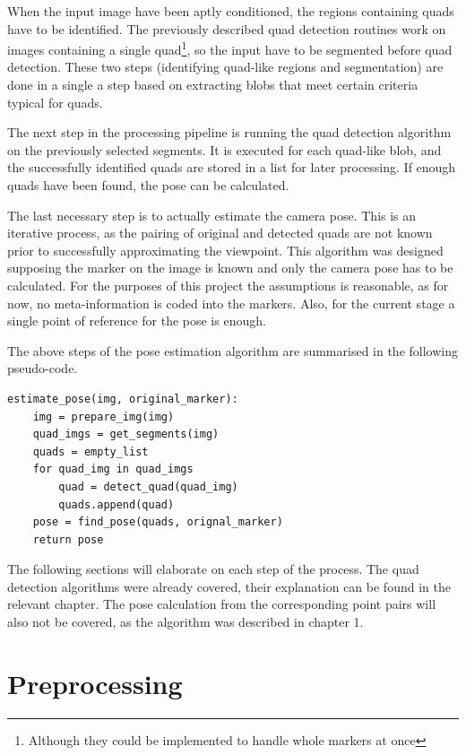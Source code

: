 When the input image have been aptly conditioned, the regions containing quads have to be identified.
The previously described quad detection routines work on images containing a single quad\footnote{Although they could be implemented to handle whole markers at once}, so the input have to be segmented before quad detection.
These two steps (identifying quad-like regions and segmentation) are done in a single a step based on extracting blobs that meet certain criteria typical for quads.

The next step in the processing pipeline is running the quad detection algorithm on the previously selected segments.
It is executed for each quad-like blob, and the successfully identified quads are stored in a list for later processing.
If enough quads have been found, the pose can be calculated.

The last necessary step is to actually estimate the camera pose.
This is an iterative process, as the pairing of original and detected quads are not known prior to successfully approximating the viewpoint.
This algorithm was designed supposing the marker on the image is known and only the camera pose has to be calculated.
For the purposes of this project the assumptions is reasonable, as for now, no meta-information is coded into the markers.
Also, for the current stage a single point of reference for the pose is enough.

The above steps of the pose estimation algorithm are summarised in the following pseudo-code.
\begin{lstlisting}
estimate_pose(img, original_marker):
    img = prepare_img(img)
    quad_imgs = get_segments(img)
    quads = empty_list
    for quad_img in quad_imgs
        quad = detect_quad(quad_img)
        quads.append(quad)
    pose = find_pose(quads, orignal_marker) 
    return pose
\end{lstlisting}
The following sections will elaborate on each step of the process.
The quad detection algorithms were already covered, their explanation can be found in the relevant chapter.
The pose calculation from the corresponding point pairs will also not be covered, as the algorithm was described in chapter 1.

\section{Preprocessing}

